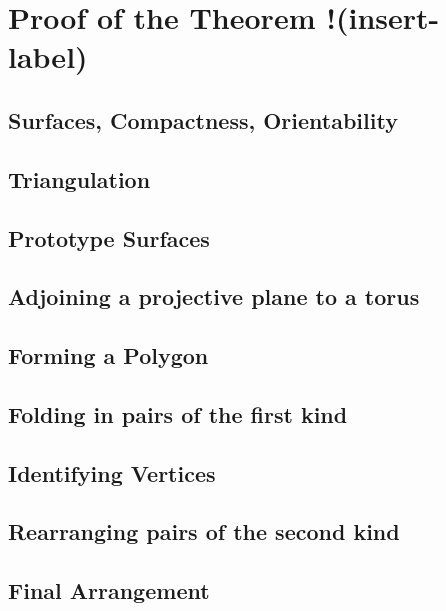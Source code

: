\section{Proof of the Theorem !(insert-label)}
\label{sec:proof}

\subsection{Surfaces, Compactness, Orientability}
\label{sec:proof:surfaces}

\subsection{Triangulation}
\label{sec:proof:triangulation}

\subsection{Prototype Surfaces}
\label{sec:proof:prototype}

\subsection{Adjoining a projective plane to a torus}
\label{sec:proof:adjoin}

\subsection{Forming a Polygon}
\label{sec:proof:polygon}

\subsection{Folding in pairs of the first kind}
\label{sec:proof:vertices}

\subsection{Identifying Vertices}
\label{sec:proof:folding}

\subsection{Rearranging pairs of the second kind}
\label{sec:proof:second}

\subsection{Final Arrangement}
\label{sec:proof:final}


